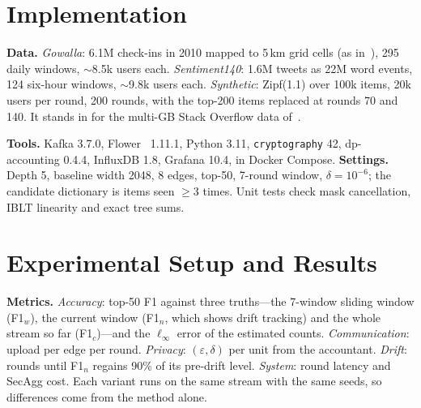 \documentclass[conference]{IEEEtran}
\newcommand{\eps}{\varepsilon}
\begin{document}
\section{Implementation}
\textbf{Data.} \emph{Gowalla}: 6.1M check-ins in 2010 mapped to 5\,km grid cells (as in~\cite{wu2023}), 295 daily windows,
$\sim$8.5k users each. \emph{Sentiment140}: 1.6M tweets as 22M word events, 124 six-hour windows, $\sim$9.8k users each.
\emph{Synthetic}: Zipf(1.1) over 100k items, 20k users per round, 200 rounds, with the top-200 items replaced at rounds 70 and 140.
It stands in for the multi-GB Stack Overflow data of~\cite{gascon2023}.

\textbf{Tools.} Kafka 3.7.0, Flower~\cite{beutel2020} 1.11.1, Python 3.11, \texttt{cryptography} 42, dp-accounting 0.4.4,
InfluxDB 1.8, Grafana 10.4, in Docker Compose. \textbf{Settings.} Depth 5, baseline width 2048, 8 edges, top-50,
7-round window, $\delta=10^{-6}$; the candidate dictionary is items seen $\ge3$ times. Unit tests check mask cancellation,
IBLT linearity and exact tree sums.

\section{Experimental Setup and Results}\label{sec:res}
\textbf{Metrics.} \emph{Accuracy}: top-50 F1 against three truths---the 7-window sliding window (F1$_w$), the current window
(F1$_n$, which shows drift tracking) and the whole stream so far (F1$_c$)---and the $\ell_\infty$ error of the estimated counts.
\emph{Communication}: upload per edge per round. \emph{Privacy}: $(\eps,\delta)$ per unit from the accountant. \emph{Drift}:
rounds until F1$_n$ regains 90\% of its pre-drift level. \emph{System}: round latency and SecAgg cost. Each variant runs on
the same stream with the same seeds, so differences come from the method alone.
\end{document}

